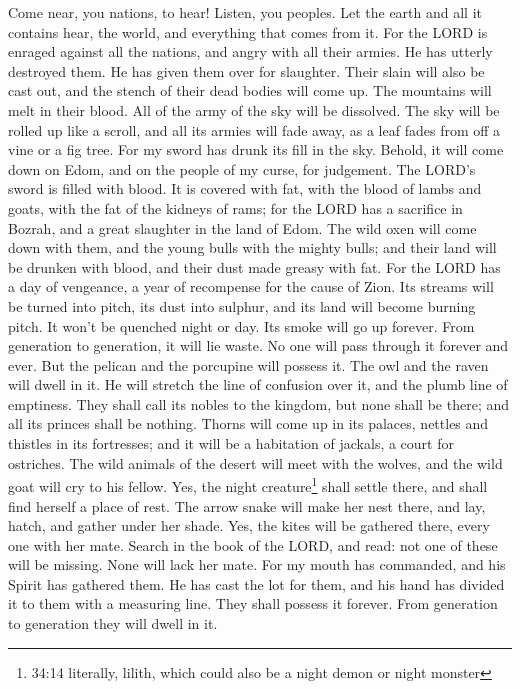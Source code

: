  Come near, you nations, to hear! Listen, you peoples. Let
the earth and all it contains hear, the world, and everything that comes
from it.  For the LORD is enraged against all the nations,
and angry with all their armies. He has utterly destroyed them. He has
given them over for slaughter.  Their slain will also be
cast out, and the stench of their dead bodies will come up. The
mountains will melt in their blood.  All of the army of the
sky will be dissolved. The sky will be rolled up like a scroll, and all
its armies will fade away, as a leaf fades from off a vine or a fig
tree.  For my sword has drunk its fill in the sky. Behold,
it will come down on Edom, and on the people of my curse, for judgement.
 The LORD's sword is filled with blood. It is covered with
fat, with the blood of lambs and goats, with the fat of the kidneys of
rams; for the LORD has a sacrifice in Bozrah, and a great slaughter in
the land of Edom.  The wild oxen will come down with them,
and the young bulls with the mighty bulls; and their land will be
drunken with blood, and their dust made greasy with fat. 
For the LORD has a day of vengeance, a year of recompense for the cause
of Zion.  Its streams will be turned into pitch, its dust
into sulphur, and its land will become burning pitch.  It
won't be quenched night or day. Its smoke will go up forever. From
generation to generation, it will lie waste. No one will pass through it
forever and ever.  But the pelican and the porcupine will
possess it. The owl and the raven will dwell in it. He will stretch the
line of confusion over it, and the plumb line of emptiness.
 They shall call its nobles to the kingdom, but none shall
be there; and all its princes shall be nothing.  Thorns
will come up in its palaces, nettles and thistles in its fortresses; and
it will be a habitation of jackals, a court for ostriches. 
The wild animals of the desert will meet with the wolves, and the wild
goat will cry to his fellow. Yes, the night creature\footnote{34:14
  literally, lilith, which could also be a night demon or night monster}
shall settle there, and shall find herself a place of rest.
 The arrow snake will make her nest there, and lay, hatch,
and gather under her shade. Yes, the kites will be gathered there, every
one with her mate.  Search in the book of the LORD, and
read: not one of these will be missing. None will lack her mate. For my
mouth has commanded, and his Spirit has gathered them.  He
has cast the lot for them, and his hand has divided it to them with a
measuring line. They shall possess it forever. From generation to
generation they will dwell in it.

